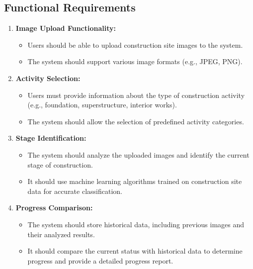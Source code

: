 \documentclass[12pt,a4paper]{report}
\begin{document}
\subsection{Functional Requirements}
\begin{enumerate}
    \item \textbf{Image Upload Functionality:}
    \begin{itemize}
        \item Users should be able to upload construction site images to the system.
        \item The system should support various image formats (e.g., JPEG, PNG).
    \end{itemize}
    \item \textbf{Activity Selection:}
    \begin{itemize}
        \item Users must provide information about the type of construction activity (e.g., foundation, superstructure, interior works).
        \item The system should allow the selection of predefined activity categories.
    \end{itemize}
    \item \textbf{Stage Identification:}
    \begin{itemize}
        \item The system should analyze the uploaded images and identify the current stage of construction.
        \item It should use machine learning algorithms trained on construction site data for accurate classification.
    \end{itemize}
    \item \textbf{Progress Comparison:}
    \begin{itemize}
        \item The system should store historical data, including previous images and their analyzed results.
        \item It should compare the current status with historical data to determine progress and provide a detailed progress report.
    \end{itemize}
\end{enumerate}
\end{document}
